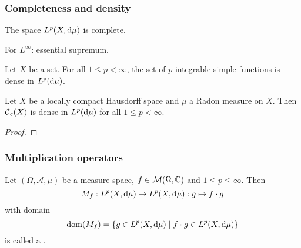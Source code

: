 \subsubsection{Completeness and density}
\begin{theorem}
The space $L^p(X,\operatorname{d \!}{\mu})$ is complete.
\end{theorem}

For $L^\infty$: essential supremum.

\begin{proposition}
Let $X$ be a set. For all $1\leq p < \infty$, the set of $p$-integrable simple functions is dense in $L^p(\operatorname{d \!}{\mu})$.
\end{proposition}


\begin{proposition}
Let $X$ be a locally compact Hausdorff space and $\mu$ a Radon measure on $X$. Then $\operatorname{\mathcal{C}}_c(X)$ is dense in $L^p(\operatorname{d \!}{\mu})$ for all $1\leq p < \infty$.
\end{proposition}
\begin{proof}

\end{proof}

\subsubsection{Multiplication operators}
\begin{definition}
Let $(\Omega, \mathcal{A}, \mu)$ be a measure space, $f\in \operatorname{\mathcal{M}}(\Omega, \mathbb{C})$ and $1\leq p \leq \infty$. Then
\[ M_f: L^p(X, \operatorname{d \!}{\mu}) \to L^p(X, \operatorname{d \!}{\mu}): g\mapsto f\cdot g \]
with domain
\[ \dom(M_f) = \setbuilder{g\in L^p(X, \diff{\mu})}{f\cdot g \in L^p(X, \diff{\mu})} \]
is called a .
\end{definition}

